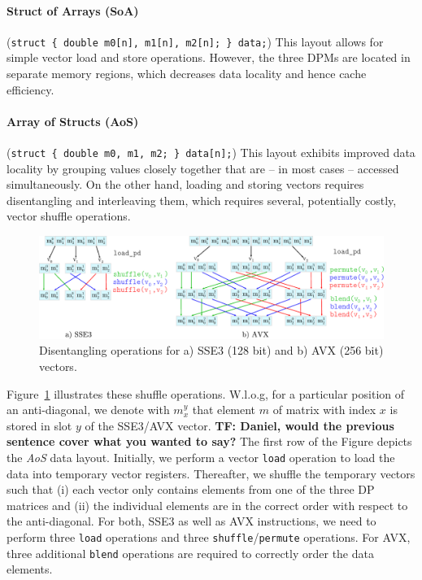 \documentclass[runningheads,a4paper]{llncs}
\begin{document}
\paragraph*{Struct of Arrays (SoA)} ({\small\texttt{struct \{ double m0[n], m1[n], m2[n]; \} data;}}) 
This layout allows for simple vector load and store operations. 
However, the three DPMs are located in separate memory regions, which decreases
data locality and hence cache efficiency.

\paragraph*{Array of Structs (AoS)} ({\small\texttt{struct \{ double m0, m1, m2; \}
data[n];}}) This layout exhibits improved data locality by grouping values
closely together that are -- in most cases -- accessed simultaneously. On the
other hand, loading and storing vectors requires disentangling and interleaving
them, which requires several, potentially costly, vector shuffle operations. 

\begin{figure}[ht!]
  \centering
  \includegraphics[scale=0.6]{figures/shuffle.pdf}
  \caption{Disentangling operations for a) SSE3 (128 bit) and b) AVX (256 bit) vectors.}
  \label{fig:shufflesse}
\end{figure}

Figure~\ref{fig:shufflesse} illustrates these shuffle operations. 
W.l.o.g, for a particular position of an anti-diagonal, we denote with $m_x^y$
that element $m$ of matrix with index $x$ is stored in slot $y$ of the SSE3/AVX
vector.
\textbf{TF: Daniel, would the previous sentence cover what you wanted to say?}
The first row of the Figure depicts the {\em AoS} data layout. 
Initially, we perform a vector \texttt{load} operation
to load the data into temporary vector registers. 
Thereafter, we shuffle the temporary vectors such that (i) each vector only contains elements from one of the three DP matrices and 
(ii) the individual elements are in the correct order with respect to  the anti-diagonal. 
For both, SSE3 as well as AVX instructions, we need to perform three \texttt{load} operations and three \texttt{shuffle}/\texttt{permute} operations. 
For AVX, three additional \texttt{blend} operations are required to correctly order the data elements. 
\end{document}
